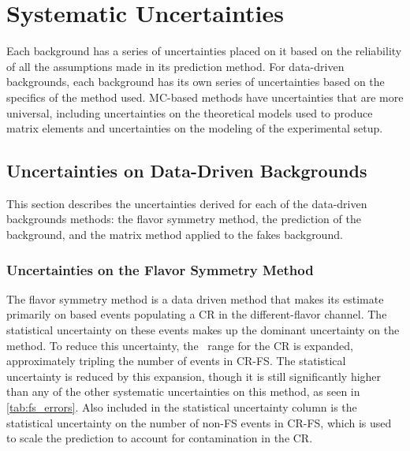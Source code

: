 
\chapter{Systematic Uncertainties} %

\label{ch:background_uncertainties} 

Each background has a series of uncertainties placed on it based on the reliability of all the assumptions made in its prediction method. For data-driven backgrounds, each background has its own series of uncertainties based on the specifics of the method used. \ac{MC}-based methods have uncertainties that are more universal, including uncertainties on the theoretical models used to produce matrix elements and uncertainties on the modeling of the experimental setup. 

\section{Uncertainties on Data-Driven Backgrounds}

This section describes the uncertainties derived for each of the data-driven backgrounds methods: the flavor symmetry method, the \gjets prediction of the \dyjets background, and the matrix method applied to the fakes background.  

\subsection{Uncertainties on the Flavor Symmetry Method}
\label{sec:unc_fs}

The flavor symmetry method is a data driven method that makes its estimate primarily on based events populating a \ac{CR} in the different-flavor channel. The statistical uncertainty on these events makes up the dominant uncertainty on the method. To reduce this uncertainty, the \mll~range for the \ac{CR} is expanded, approximately tripling the number of events in CR-FS. The statistical uncertainty is reduced by this expansion, though it is still significantly higher than any of the other systematic uncertainties on this method, as seen in \autoref{tab:fs_errors}. Also included in the statistical uncertainty column is the statistical uncertainty on the number of non-\ac{FS} events in CR-FS, which is used to scale the prediction to account for contamination in the \ac{CR}. 

